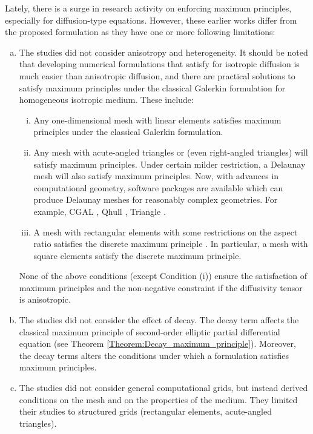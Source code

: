 \documentclass[11pt]{amsart}
\begin{document}
Lately, there is a surge in research activity on enforcing maximum principles, especially 
for diffusion-type equations. However, these earlier works differ from the proposed 
formulation as they have one or more following limitations: 
\begin{enumerate}[(a)]
\item The studies did not consider anisotropy and heterogeneity. It should be noted that 
  developing numerical formulations that satisfy for isotropic diffusion is much easier 
  than anisotropic diffusion, and there are practical solutions to satisfy maximum principles 
  under the classical Galerkin formulation for homogeneous isotropic medium. These include: 
  \begin{enumerate}[(i)]
  \item Any one-dimensional mesh with linear elements satisfies maximum principles under 
    the classical Galerkin formulation. 
  \item Any mesh with acute-angled triangles or (even right-angled triangles) will satisfy 
    maximum principles. Under certain milder restriction, a Delaunay mesh will also satisfy 
    maximum principles. Now, with advances in computational geometry, software packages are 
    available which can produce Delaunay meshes for reasonably complex geometries. For example, 
    \textsf{CGAL} \cite{cgal}, \textsf{Qhull} \cite{Barber96thequickhull,qhull}, \textsf{Triangle} 
    \cite{shewchuk96b}.
  \item A mesh with rectangular elements with some restrictions on the aspect ratio satisfies the 
  discrete maximum principle \cite{Christie_Hall_IJNME_1984_v20_p549}.  In particular, a mesh 
  with square elements satisfy the discrete maximum principle. 
  \end{enumerate}
  None of the above conditions (except Condition (i)) ensure the satisfaction of maximum 
  principles and the non-negative constraint if the diffusivity tensor is anisotropic. 
  \item The studies did not consider the effect of decay. The decay term affects the 
    classical maximum principle of second-order elliptic partial differential equation 
    (see Theorem \ref{Theorem:Decay_maximum_principle}). Moreover, the decay terms 
    alters the conditions under which a formulation satisfies maximum principles. 
  \item The studies did not consider general computational grids, but instead derived 
    conditions on the mesh and on the properties of the medium. They limited their 
    studies to structured grids (rectangular elements, acute-angled triangles).
\end{enumerate}
\end{document}
